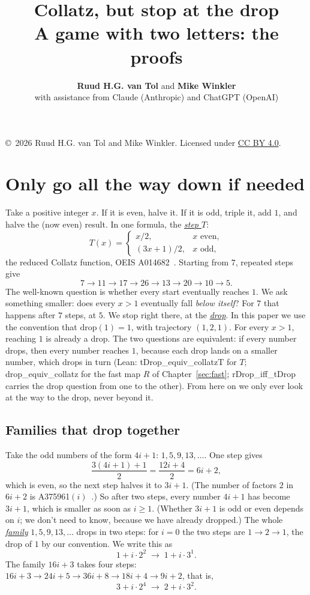 \documentclass[11pt,a4paper,titlepage]{article}
\title{\textbf{Collatz, but stop at the drop}\\[0.5ex]
  \Large A game with two letters: the proofs}
\author{\textbf{Ruud H.G. van Tol} and \textbf{Mike Winkler} \\ \small with assistance from Claude (Anthropic) and ChatGPT (OpenAI)}
\date{October 2026\\[8ex]
  \begin{tikzpicture}[scale=0.9]\dropgridXXXIX
    \draw[black!45, fill=red!22] (6.25,-1.20) rectangle ++(1.25,-0.60);
    \node at (6.875,-1.500) {\small $38$};
    \draw[chordblue!70!black, line width=1pt] (0.625,-0.300) ellipse (0.36 and 0.21);
    \draw[red!65!black, line width=1pt] (6.875,-1.500) ellipse (0.36 and 0.21);
  \end{tikzpicture}}
\makeatletter
\newcommand{\termhere}[1]{\leavevmode
  \Hy@raisedlink{\hyper@anchorstart{term:#1}\hyper@anchorend}}
\newcommand{\keyterm}[2]{\hyperlink{box:#1}{\emph{#2}}}
\newcommand{\lean}[1]{\textsf{#1}}
\makeatother
\begin{document}
\maketitle

\begin{center}\small
  \copyright\ 2026 Ruud H.G. van Tol and Mike Winkler. Licensed under \href{https://creativecommons.org/licenses/by/4.0/}{CC BY 4.0}.
\end{center}

\section{Only go all the way down if needed}
\label{sec:intro}

\termhere{stepT}Take a positive integer $x$. If it is even, halve it. If it is odd, triple it,
add $1$, and halve the (now even) result. In one formula, the \keyterm{stepT}{step $T$}:
\[
T(x) = \begin{cases} x/2, & x \text{ even},\\ (3x+1)/2, & x \text{ odd}, \end{cases}
\]
the reduced Collatz function, OEIS A014682~\cite{OEIS_A014682}.
Starting from $7$, repeated steps give
\[
7 \to 11 \to 17 \to 26 \to 13 \to 20 \to 10 \to 5 .
\]
The well-known question is whether every start eventually reaches $1$. \termhere{drop}We ask
something smaller: does every $x > 1$ eventually fall \emph{below itself}? For
$7$ that happens after $7$ steps, at $5$. We stop right there, at the
\keyterm{drop}{drop}. In this paper we use the convention that $\mathrm{drop}(1) = 1$,
with trajectory $(1, 2, 1)$. For every $x > 1$, reaching $1$ is already a drop.
The two questions are equivalent: if every number drops, then every number
reaches $1$, because each drop lands on a smaller number, which drops in turn
(Lean: \lean{tDrop\_equiv\_collatzT} for $T$; \lean{drop\_equiv\_collatz} for the fast
map $R$ of Chapter~\ref{sec:fast}; \lean{rDrop\_iff\_tDrop} carries the drop question
from one to the other). From here on we only ever look at the way
to the drop, never beyond it.

\subsection*{Families that drop together}

\termhere{family}Take the odd numbers of the form $4i+1$: $1, 5, 9, 13, \dots$. One step gives
\[
\frac{3(4i+1)+1}{2} = \frac{12i+4}{2} = 6i+2,
\]
which is even, so the next step halves it to $3i+1$. (The number of factors $2$ in $6i+2$ is
A375961$(i)$~\cite{OEIS_A375961}.) So after two steps,
every number $4i+1$ has become $3i+1$, which is smaller as soon as $i \ge 1$.
(Whether $3i+1$ is odd or even depends on $i$; we don't need to know, because
we have already dropped.) The whole \keyterm{family}{family} $1, 5, 9, 13, \dots$ drops in two
steps: for $i = 0$ the two steps are $1 \to 2 \to 1$, the drop of $1$ by our
convention. We write this as
\[
1 + i\cdot 2^2 \;\to\; 1 + i\cdot 3^1 .
\]
The family $16i+3$ takes four steps:
$16i+3 \to 24i+5 \to 36i+8 \to 18i+4 \to 9i+2$, that is,
\[
3 + i\cdot 2^4 \;\to\; 2 + i\cdot 3^2 .
\]
\end{document}
